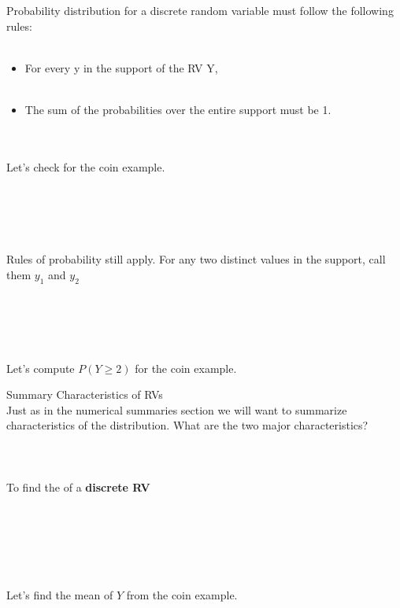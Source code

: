 Probability distribution for a discrete random variable must follow the following rules:\\~\\
\begin{itemize}
\item For every y in the support of the RV Y, \\~\\
\item The sum of the probabilities over the entire support must be 1.  \\~\\~\\
\end{itemize}

Let's check for the coin example.\\~\\~\\~\\~\\~\\

Rules of probability still apply.  For any two distinct values in the support, call them $y_1$ and $y_2$\\~\\~\\~\\~\\~\\
Let's compute $P(Y\geq 2)$ for the coin example.

\newpage

\large Summary Characteristics of RVs\normalsize\\
Just as in the numerical summaries section we will want to summarize characteristics of the distribution.  What are the two major characteristics?\\~\\~\\~\\

To find the \underbar{~~~~~~~~~~~~~~~~~~~~~~~~~~~~~~~~~~~~~~~~~~~~~~~~~~~~~~~~~~~~~~~~~} of a \textbf{discrete RV}\\~\\~\\~\\~\\~\\~\\

Let's find the mean of $Y$ from the coin example.\\~\\~\\~\\~\\~\\~\\~\\~\\~\\~\\

